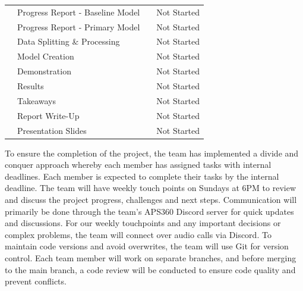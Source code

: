 \documentclass{article} %
\begin{document}
\begin{table}[t]
\begin{center}
\begin{tabular}{l|l|l|l}
                & Progress Report - Baseline Model                   &                      & Not Started \\
                & Progress Report - Primary Model                    &                      & Not Started \\
                & Data Splitting \& Processing                       &                      & Not Started \\
                & Model Creation                                     &                      & Not Started \\
                & Demonstration                                      &                      & Not Started \\
                & Results                                            &                      & Not Started \\
                & Takeaways                                          &                      & Not Started \\
                & Report Write-Up                                    &                      & Not Started \\
                & Presentation Slides                                &                      & Not Started \\
\hline
\end{tabular}
\end{center}
\end{table}

To ensure the completion of the project, the team has implemented a divide and conquer approach whereby each member has assigned tasks with internal deadlines. Each member is expected to complete their tasks by the internal deadline. The team will have weekly touch points on Sundays at 6PM to review  and discuss the project progress, challenges and next steps.
Communication will primarily be done through the team’s APS360 Discord server for quick updates and discussions. For our weekly touchpoints and any important decisions or complex problems, the team will connect over audio calls via Discord.
To maintain code versions and avoid overwrites, the team will use Git for version control. Each team member will work on separate branches, and before merging to the main branch, a code review will be conducted to ensure code quality and prevent conflicts.
\end{document}
